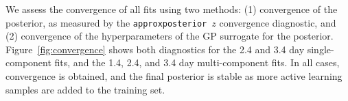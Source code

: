 \documentclass[twocolumn, twocolappendix]{aastex63}
\def\approxposterior{\texttt{approxposterior}}
\begin{document}
We assess the convergence of all fits using two methods: (1) convergence of the posterior, as measured by the \approxposterior~$z$ convergence diagnostic, and (2) convergence of the hyperparameters of the GP surrogate for the posterior. Figure~\ref{fig:convergence} shows both diagnostics for the 2.4 and 3.4 day single-component fits, and the 1.4, 2.4, and 3.4 day multi-component fits. In all cases, convergence is obtained, and the final posterior is stable as more active learning samples are added to the training set.




\end{document}
